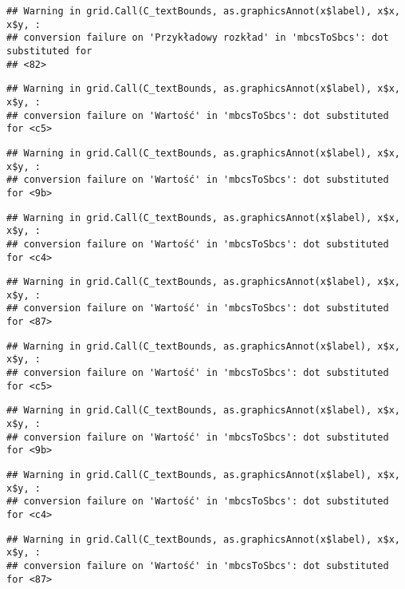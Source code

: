 \documentclass[
]{book}
\begin{document}
\begin{verbatim}
## Warning in grid.Call(C_textBounds, as.graphicsAnnot(x$label), x$x, x$y, :
## conversion failure on 'Przykładowy rozkład' in 'mbcsToSbcs': dot substituted for
## <82>
\end{verbatim}

\begin{verbatim}
## Warning in grid.Call(C_textBounds, as.graphicsAnnot(x$label), x$x, x$y, :
## conversion failure on 'Wartość' in 'mbcsToSbcs': dot substituted for <c5>
\end{verbatim}

\begin{verbatim}
## Warning in grid.Call(C_textBounds, as.graphicsAnnot(x$label), x$x, x$y, :
## conversion failure on 'Wartość' in 'mbcsToSbcs': dot substituted for <9b>
\end{verbatim}

\begin{verbatim}
## Warning in grid.Call(C_textBounds, as.graphicsAnnot(x$label), x$x, x$y, :
## conversion failure on 'Wartość' in 'mbcsToSbcs': dot substituted for <c4>
\end{verbatim}

\begin{verbatim}
## Warning in grid.Call(C_textBounds, as.graphicsAnnot(x$label), x$x, x$y, :
## conversion failure on 'Wartość' in 'mbcsToSbcs': dot substituted for <87>
\end{verbatim}

\begin{verbatim}
## Warning in grid.Call(C_textBounds, as.graphicsAnnot(x$label), x$x, x$y, :
## conversion failure on 'Wartość' in 'mbcsToSbcs': dot substituted for <c5>
\end{verbatim}

\begin{verbatim}
## Warning in grid.Call(C_textBounds, as.graphicsAnnot(x$label), x$x, x$y, :
## conversion failure on 'Wartość' in 'mbcsToSbcs': dot substituted for <9b>
\end{verbatim}

\begin{verbatim}
## Warning in grid.Call(C_textBounds, as.graphicsAnnot(x$label), x$x, x$y, :
## conversion failure on 'Wartość' in 'mbcsToSbcs': dot substituted for <c4>
\end{verbatim}

\begin{verbatim}
## Warning in grid.Call(C_textBounds, as.graphicsAnnot(x$label), x$x, x$y, :
## conversion failure on 'Wartość' in 'mbcsToSbcs': dot substituted for <87>
\end{verbatim}
\end{document}
